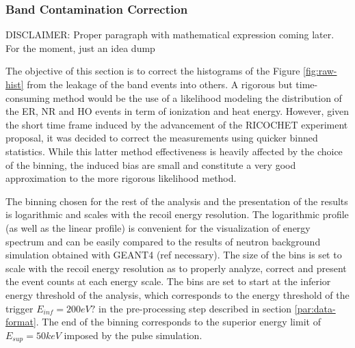 \subsubsection{Band Contamination Correction}

{\color{red} DISCLAIMER: Proper paragraph with mathematical expression coming later. For the moment, just an idea dump}

The objective of this section is to correct the histograms of the Figure \ref{fig:raw-hist} from the leakage of the band events into others. A rigorous but time-consuming method would be the use of a likelihood modeling the distribution of the ER, NR and HO events in term of ionization and heat energy. However, given the short time frame induced by the advancement of the RICOCHET experiment proposal, it was decided to correct the measurements using quicker binned statistics. While this latter method effectiveness is heavily affected by the choice of the binning, the induced bias are small and constitute a very good approximation to the more rigorous likelihood method.

The binning chosen for the rest of the analysis and the presentation of the results is logarithmic and scales with the recoil energy resolution. The logarithmic profile (as well as the linear profile) is convenient for the visualization of energy spectrum and can be easily compared to the results of neutron background simulation obtained with GEANT4 (ref necessary). The size of the bins is set to scale with the recoil energy resolution as to properly analyze, correct and present the event counts at each energy scale.
The bins are set to start at the inferior energy threshold of the analysis, which corresponds to the energy threshold of the trigger $E_{inf}=200eV?$ in the pre-processing step described in section \ref{par:data-format}. The end of the binning corresponds to the superior energy limit of $E_{sup}=50keV$ imposed by the pulse simulation.

